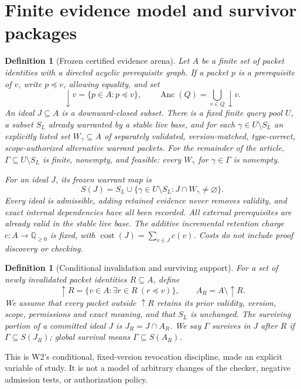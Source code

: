 \documentclass[11pt,letterpaper]{article}
\newtheorem{definition}[theorem]{Definition}
\DeclareMathOperator{\cost}{cost}
\DeclareMathOperator{\Anc}{Anc}
\newcommand{\Gam}{\Gamma}
\begin{document}
\section{Finite evidence model and survivor packages}\label{gl-first-W3-s2}
\begin{definition}[Frozen certified evidence arena]\label{def:arena}
Let $A$ be a finite set of packet identities with a directed acyclic prerequisite graph. If a packet $p$ is a prerequisite of $v$, write $p\preceq v$, allowing equality, and set
\[
\downarrow v=\{p\in A:p\preceq v\},\qquad
\Anc(Q)=\bigcup_{v\in Q}\downarrow v.
\]
An \emph{ideal} $J\subseteq A$ is a downward-closed subset. There is a fixed finite query pool $U$, a subset $S_L$ already warranted by a stable live base, and for each $\gamma\in U\setminus S_L$ an explicitly listed set $W_\gamma\subseteq A$ of separately validated, version-matched, type-correct, scope-authorized alternative warrant packets. For the remainder of the article, $\Gam\subseteq U\setminus S_L$ is \emph{finite, nonempty, and feasible}: every $W_\gamma$ for $\gamma\in\Gam$ is nonempty.

For an ideal $J$, its frozen warrant map is
\[
S(J)=S_L\cup\{\gamma\in U\setminus S_L:J\cap W_\gamma\ne\varnothing\}.
\]
Every ideal is admissible, adding retained evidence never removes validity, and exact internal dependencies have all been recorded. All external prerequisites are already valid in the stable live base. The additive incremental retention charge $c:A\to\mathbb Q_{\ge0}$ is fixed, with $\cost(J)=\sum_{v\in J}c(v)$. Costs do not include proof discovery or checking.
\end{definition}

\begin{definition}[Conditional invalidation and surviving support]\label{def:invalidate}
For a set of newly invalidated packet identities $R\subseteq A$, define
\[
\uparrow R=\{v\in A:\exists r\in R\ (r\preceq v)\},\qquad
A_R=A\setminus\uparrow R.
\]
We assume that every packet outside $\uparrow R$ retains its prior validity, version, scope, permissions and exact meaning, and that $S_L$ is unchanged. The surviving portion of a committed ideal $J$ is $J_R=J\cap A_R$. We say $\Gam$ \emph{survives in $J$ after $R$} if $\Gam\subseteq S(J_R)$; \emph{global survival} means $\Gam\subseteq S(A_R)$.
\end{definition}

This is W2's conditional, fixed-version revocation discipline, made an explicit variable of study. It is not a model of arbitrary changes of the checker, negative admission tests, or authorization policy.
\end{document}
